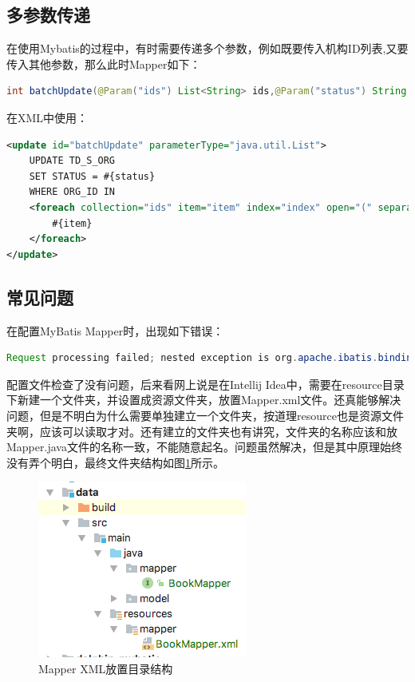 \documentclass[letter]{book}
\begin{document}
\subsection{多参数传递}

在使用Mybatis的过程中，有时需要传递多个参数，例如既要传入机构ID列表,又要传入其他参数，那么此时Mapper如下：

\begin{lstlisting}[language=Java]
int batchUpdate(@Param("ids") List<String> ids,@Param("status") String status);
\end{lstlisting}

在XML中使用：

\begin{lstlisting}[language=XML]
<update id="batchUpdate" parameterType="java.util.List">
	UPDATE TD_S_ORG
	SET STATUS = #{status}
	WHERE ORG_ID IN
	<foreach collection="ids" item="item" index="index" open="(" separator="," close=")">
		#{item}
	</foreach>
</update>
\end{lstlisting}

\subsection{常见问题}

在配置MyBatis Mapper时，出现如下错误：

\begin{lstlisting}[language=Java]
Request processing failed; nested exception is org.apache.ibatis.binding.BindingException: Invalid bound statement (not found)
\end{lstlisting}

配置文件检查了没有问题，后来看网上说是在Intellij Idea中，需要在resource目录下新建一个文件夹，并设置成资源文件夹，放置Mapper.xml文件。还真能够解决问题，但是不明白为什么需要单独建立一个文件夹，按道理resource也是资源文件夹啊，应该可以读取才对。还有建立的文件夹也有讲究，文件夹的名称应该和放Mapper.java文件的名称一致，不能随意起名。问题虽然解决，但是其中原理始终没有弄个明白，最终文件夹结构如图\ref{fig:mapperreourcestructure}所示。

\begin{figure}[htbp]
	\centering
	\includegraphics[scale=0.7]{mapperreourcestructure.png}
	\caption{Mapper XML放置目录结构}
	\label{fig:mapperreourcestructure}
\end{figure}
\end{document}

